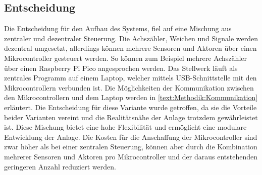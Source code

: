 \subsection{Entscheidung}\label{text:Methodik:Aufbau-des-Systems:Entscheidung}

Die Entscheidung für den Aufbau des Systems, fiel auf eine Mischung aus zentraler und dezentraler Steuerung. Die Achszähler, Weichen und Signale werden dezentral umgesetzt, allerdings können mehrere Sensoren und Aktoren über einen Mikrocontroller gesteuert werden. So können zum Beispiel mehrere Achszähler über einen Raspberry Pi Pico angesprochen werden. Das Stellwerk läuft als zentrales Programm auf einem Laptop, welcher mittels USB-Schnittstelle mit den Mikrocontrollern verbunden ist. Die Möglichkeiten der Kommunikation zwischen den Mikrocontrollern und dem Laptop werden in \autoref{text:Methodik:Kommunikation} erläutert. 
\newline
Die Entscheidung für diese Variante wurde getroffen, da sie die Vorteile beider Varianten vereint und die Realitätsnähe der Anlage trotzdem gewährleistet ist. Diese Mischung bietet eine hohe Flexibilität und ermöglicht eine modulare Entwicklung der Anlage. Die Kosten für die Anschaffung der Mikrocontroller sind zwar höher als bei einer zentralen Steuerung, können aber durch die Kombination mehrerer Sensoren und Aktoren pro Mikrocontroller und der daraus entstehenden geringeren Anzahl reduziert werden.
